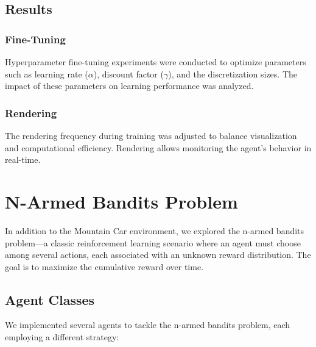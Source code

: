 \documentclass{article}
\begin{document}
\subsection{Results}

\subsubsection{Fine-Tuning}
Hyperparameter fine-tuning experiments were conducted to optimize parameters such as learning rate (\(\alpha\)), discount 
factor (\(\gamma\)), and the discretization sizes. The impact of these parameters on learning performance was analyzed.

\subsubsection{Rendering}
The rendering frequency during training was adjusted to balance visualization and computational efficiency. Rendering allows 
monitoring the agent's behavior in real-time.


\section{N-Armed Bandits Problem}
In addition to the Mountain Car environment, we explored the n-armed bandits problem—a classic reinforcement learning scenario where an agent must choose among several actions, each associated with an unknown reward distribution. The goal is to maximize the cumulative reward over time.

\subsection{Agent Classes}
We implemented several agents to tackle the n-armed bandits problem, each employing a different strategy:
\end{document}
